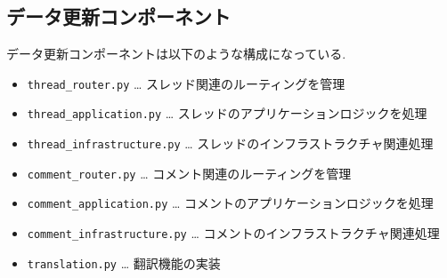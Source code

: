 \documentclass[b5paper,12pt,dvipdfmx]{jsreport}
\newcommand{\red}[1]{\textcolor{red}{#1}}
\begin{document}








\subsection*{データ更新コンポーネント}

データ更新コンポーネントは以下のような構成になっている.

\begin{itemize}
    \item \texttt{thread\_router.py} … スレッド関連のルーティングを管理
    \item \texttt{thread\_application.py} … スレッドのアプリケーションロジックを処理
    \item \texttt{thread\_infrastructure.py} … スレッドのインフラストラクチャ関連処理
    \item \texttt{comment\_router.py} … コメント関連のルーティングを管理
    \item \texttt{comment\_application.py} … コメントのアプリケーションロジックを処理
    \item \texttt{comment\_infrastructure.py} … コメントのインフラストラクチャ関連処理
    \item \texttt{translation.py} … 翻訳機能の実装
\end{itemize}
\end{document}
